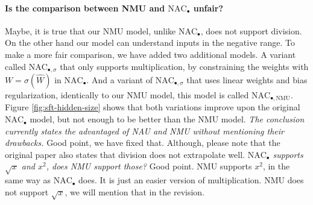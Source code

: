 \documentclass{article}
\begin{document}
\vspace{-0.3cm} \paragraph{Is the comparison between NMU and $\mathrm{NAC}_{\bullet}$ unfair?} %
Maybe, it is true that our NMU model, unlike $\mathrm{NAC}_{\bullet}$, does not support division. On the other hand our model can understand inputs in the negative range. To make a more fair comparison, we have added two additional models. A variant called $\mathrm{NAC}_{\bullet, \sigma}$ that only supports multiplication, by constraining the weights with $W = \sigma(\hat{W})$ in $\mathrm{NAC}_{\bullet}$. And a variant of $\mathrm{NAC}_{\bullet, \sigma}$ that uses linear weights and bias regularization, identically to our NMU model, this model is called $\mathrm{NAC}_{\bullet, \mathrm{NMU}}$. Figure \ref{fig:sft-hidden-size} shows that both variations improve upon the original $\mathrm{NAC}_{\bullet}$ model, but not enough to be better than the NMU model. %
\textit{The conclusion currently states the advantaged of NAU and NMU without mentioning their drawbacks.} Good point, we have fixed that. Although, please note that the original paper also states that division does not extrapolate well. %
\textit{$\mathrm{NAC}_{\bullet}$ supports $\sqrt{x}$ and $x^2$, does NMU support those?} Good point. NMU supports $x^2$, in the same way as $\mathrm{NAC}_{\bullet}$ does. It is just an easier version of multiplication. NMU does not support $\sqrt{x}$, we will mention that in the revision.
\end{document}
